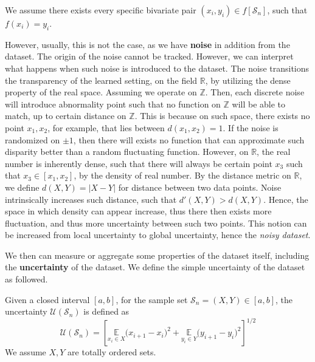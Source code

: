 \begin{assumption}[Fallacy]
    We assume there exists every specific bivariate pair $(x_{i},y_{i})\in f[\mathcal{S}_{n}]$, such that $f(x_{i})=y_{i}$. 
\end{assumption}

However, usually, this is not the case, as we have \textbf{noise} in addition from the dataset. The origin of the noise cannot be tracked. However, we can interpret what happens when such noise is introduced to the dataset. The noise transitions the transparency of the learned setting, on the field $\mathbb{R}$, by utilizing the dense property of the real space. Assuming we operate on $\mathbb{Z}$. Then, each discrete noise will introduce abnormality point such that no function on $\mathbb{Z}$ will be able to match, up to certain distance on $\mathbb{Z}$. This is because on such space, there exists no point $x_1, x_{2}$, for example, that lies between $d(x_{1},x_{2})=1$. If the noise is randomized on $\pm 1$, then there will exists no function that can approximate such disparity better than a random fluctuating function. However, on $\mathbb{R}$, the real number is inherently dense, such that there will always be certain point $x_{3}$ such that $x_{3}\in [x_{1},x_{2}]$, by the density of real number. By the distance metric on $\mathbb{R}$, we define $d(X,Y)=|X-Y|$ for distance between two data points. Noise intrinsically increases such distance, such that $d'(X,Y)> d(X,Y)$. Hence, the space in which density can appear increase, thus there then exists more fluctuation, and thus more uncertainty between such two points. This notion can be increased from local uncertainty to global uncertainty, hence the \textit{noisy dataset}. 

We then can measure or aggregate some properties of the dataset itself, including the \textbf{uncertainty} of the dataset. We define the simple uncertainty of the dataset as followed. 

\begin{definition}
    Given a closed interval $[a,b]$, for the sample set $\mathcal{S}_{n}=(X,Y)\in [a,b]$, the uncertainty $\mathcal{U}(\mathcal{S}_{n})$ is defined as 
    \begin{equation}
        \mathcal{U}(\mathcal{S}_{n}) = \left[ \underset{x_{i}\in X}{\mathbb{E}}\Big( x_{i+1} - x_{i} \Big)^{2} + \underset{y_{i}\in Y}{\mathbb{E}} \Big( y_{i+1}- y_{i} \Big)^{2} \right]^{1/2}
    \end{equation}
    We assume $X,Y$ are totally ordered sets. 
\end{definition}

